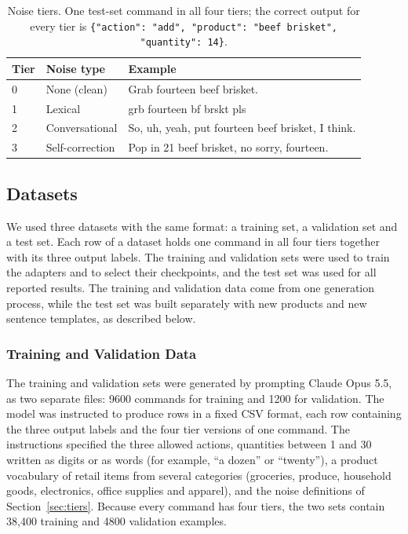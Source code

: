 \documentclass[journal,article,submit,pdftex,moreauthors]{Definitions/mdpi}
\begin{document}
\begin{table}[H]
\caption{Noise tiers. One test-set command in all four tiers; the correct output for every tier is \texttt{\{"action": "add", "product": "beef brisket", "quantity": 14\}}.\label{tab:tiers}}
\begin{tabularx}{\textwidth}{lp{3.2cm}X}
\toprule
Tier & Noise type & Example \\
\midrule
0 & None (clean) & Grab fourteen beef brisket. \\
1 & Lexical & grb fourteen bf brskt pls \\
2 & Conversational & So, uh, yeah, put fourteen beef brisket, I think. \\
3 & Self-correction & Pop in 21 beef brisket, no sorry, fourteen. \\
\bottomrule
\end{tabularx}
\end{table}

\subsection{Datasets}\label{sec:data}

We used three datasets with the same format: a training set, a validation set and a test set. Each row of a dataset holds one command in all four tiers together with its three output labels. The training and validation sets were used to train the adapters and to select their checkpoints, and the test set was used for all reported results. The training and validation data come from one generation process, while the test set was built separately with new products and new sentence templates, as described below.

\subsubsection{Training and Validation Data}\label{sec:data-train}

The training and validation sets were generated by prompting Claude Opus 5.5, as two separate files: 9600 commands for training and 1200 for validation. The model was instructed to produce rows in a fixed CSV format, each row containing the three output labels and the four tier versions of one command. The instructions specified the three allowed actions, quantities between 1 and 30 written as digits or as words (for example, ``a dozen'' or ``twenty''), a product vocabulary of retail items from several categories (groceries, produce, household goods, electronics, office supplies and apparel), and the noise definitions of Section~\ref{sec:tiers}. Because every command has four tiers, the two sets contain 38,400 training and 4800 validation examples.
\end{document}
